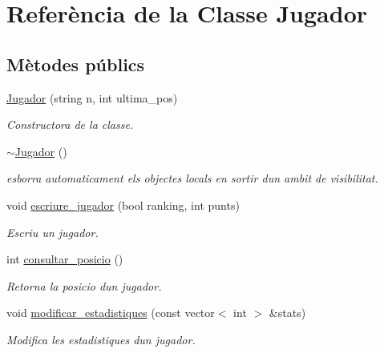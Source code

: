 \hypertarget{class_jugador}{}\section{Referència de la Classe Jugador}
\label{class_jugador}
\subsection*{Mètodes públics}
\begin{DoxyCompactItemize}
\item 
\mbox{\hyperlink{class_jugador_a0bac6ebd78bbdc5ed61be887a163ecc0}{Jugador}} (string n, int ultima\+\_\+pos)
\begin{DoxyCompactList}\small\item\em Constructora de la classe. \end{DoxyCompactList}\item 
\mbox{\hyperlink{class_jugador_a9db1d422fe3b675f92d9fd687b1f42c4}{$\sim$\+Jugador}} ()
\begin{DoxyCompactList}\small\item\em esborra automaticament els objectes locals en sortir d\textquotesingle{}un ambit de visibilitat. \end{DoxyCompactList}\item 
void \mbox{\hyperlink{class_jugador_a2649293855d738934650cd8e26011df2}{escriure\+\_\+jugador}} (bool ranking, int punts)
\begin{DoxyCompactList}\small\item\em Escriu un jugador. \end{DoxyCompactList}\item 
int \mbox{\hyperlink{class_jugador_ac23e47ec747a3bfcabcf047ef9b599de}{consultar\+\_\+posicio}} ()
\begin{DoxyCompactList}\small\item\em Retorna la posicio d\textquotesingle{}un jugador. \end{DoxyCompactList}\item 
void \mbox{\hyperlink{class_jugador_ab002dbf870a93bbe498d1f76f9e43e43}{modificar\+\_\+estadistiques}} (const vector$<$ int $>$ \&stats)
\begin{DoxyCompactList}\small\item\em Modifica les estadistiques d\textquotesingle{}un jugador. \end{DoxyCompactList}\end{DoxyCompactItemize}
